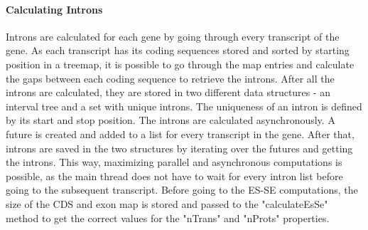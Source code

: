 \documentclass{article}
\begin{document}
    \paragraph{Calculating Introns}
    Introns are calculated for each gene by going through every transcript of the gene. As each transcript has its coding sequences stored and sorted by starting position in a treemap, it is possible to go through the map entries and calculate the gaps between each coding sequence to retrieve the introns. After all the introns are calculated, they are stored in two different data structures - an interval tree and a set with unique introns. The uniqueness of an intron is defined by its start and stop position. The introns are calculated asynchronously. A future is created and added to a list for every transcript in the gene. After that, introns are saved in the two structures by iterating over the futures and getting the introns. This way, maximizing parallel and asynchronous computations is possible, as the main thread does not have to wait for every intron list before going to the subsequent transcript. Before going to the ES-SE computations, the size of the CDS and exon map is stored and passed to the "calculateEsSe" method to get the correct values for the "nTrans" and "nProts" properties.
\end{document}
